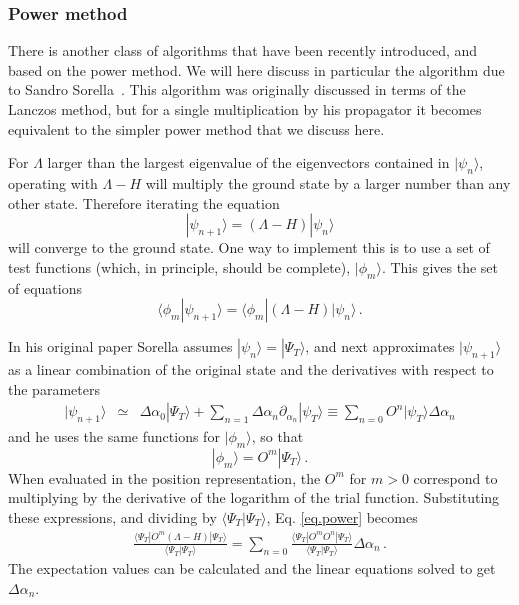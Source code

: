 \subsubsection{Power method}
\label{sec:pm}
There is another class of algorithms that have been recently introduced, and based on the power method. We will here discuss in particular the algorithm due to Sandro Sorella~\cite{Sorella01}.
This algorithm was originally discussed in terms of
the Lanczos method, but for
a single multiplication by his propagator it
becomes equivalent to the simpler power method that we discuss here.

For $\Lambda$ larger than the largest eigenvalue of the
eigenvectors contained in $|\psi_n\rangle$, operating
with $\Lambda -H$ will multiply the ground state by a larger number
than any other state. Therefore iterating the equation
\begin{equation}
|\psi_{n+1}\rangle = (\Lambda-H)|\psi_n\rangle
\end{equation}
will converge to the ground state.
One way to implement this is to use a set of test functions (which, in
principle, should be complete), $|\phi_m\rangle$. This gives the
set of equations
\begin{equation}
\label{eq.power}
\langle \phi_m |\psi_{n+1}\rangle = \langle \phi_m |(\Lambda -H)|\psi_n\rangle
\,.
\end{equation}


In his original paper Sorella assumes $|\psi_n \rangle = |\Psi_T\rangle$, and next approximates
$|\psi_{n+1}\rangle$ as a linear combination of the original state
and the derivatives with respect to the parameters
\begin{eqnarray}
\label{eq:psiprime}
|\psi_{n+1}\rangle &\simeq& \Delta \alpha_0 |\Psi_T\rangle
+\sum_{n=1} \Delta \alpha_n \partial_{\alpha_n} |\psi_T\rangle
\equiv \sum_{n=0} O^n |\psi_T\rangle \Delta \alpha_n
\end{eqnarray}
and he uses the same functions for $|\phi_m\rangle$, so that
\begin{equation}
|\phi_m\rangle = O^m |\Psi_T\rangle \,.
\end{equation}
When evaluated in the position representation, the $O^m$ for $m>0$ correspond
to multiplying by the derivative of the logarithm of the trial function.
Substituting these expressions, and dividing by $\langle \Psi_T|\Psi_T\rangle$,
Eq. \ref{eq.power} becomes
\begin{eqnarray}
\label{eq.first}
\frac{\langle \Psi_T |O^m (\Lambda-H) |\Psi_T\rangle}
{\langle \Psi_T |\Psi_T\rangle}
= \sum_{n=0} \frac{\langle \Psi_T |O^m O^n |\Psi_T\rangle}
{\langle \Psi_T |\Psi_T\rangle} \Delta \alpha_n\,.
\end{eqnarray}
The expectation values can be calculated and the linear equations solved
to get $\Delta \alpha_n$.

